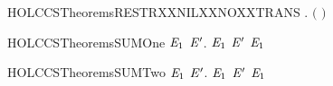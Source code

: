 \newcommand{\HOLCCSTheoremsRESTRXXLABELXXNOXXTRANS}{\UseVerbatim{HOLCCSTheoremsRESTRXXLABELXXNOXXTRANS}}
\begin{SaveVerbatim}{HOLCCSTheoremsRESTRXXNILXXNOXXTRANS}
\HOLTokenTurnstile{} \HOLSymConst{\HOLTokenForall{}}  . \HOLSymConst{\HOLTokenNeg{}}\ensuremath{(}   \HOLTokenTransBegin{}\HOLTokenTransEnd {}\ensuremath{)}
\end{SaveVerbatim}
\newcommand{\HOLCCSTheoremsRESTRXXNILXXNOXXTRANS}{\UseVerbatim{HOLCCSTheoremsRESTRXXNILXXNOXXTRANS}}
\begin{SaveVerbatim}{HOLCCSTheoremsSUMOne}
\HOLTokenTurnstile{} \HOLSymConst{\HOLTokenForall{}}  \ensuremath{\HOLBoundVar{E}\sb{\mathrm{1}}} \ensuremath{\HOLBoundVar{E}\sp{\prime{}}}.  \HOLTokenTransBegin{}\HOLTokenTransEnd \ensuremath{\HOLBoundVar{E}\sb{\mathrm{1}}} \HOLSymConst{\HOLTokenImp{}}  \HOLSymConst{\ensuremath{+}} \ensuremath{\HOLBoundVar{E}\sp{\prime{}}} \HOLTokenTransBegin{}\HOLTokenTransEnd \ensuremath{\HOLBoundVar{E}\sb{\mathrm{1}}}
\end{SaveVerbatim}
\newcommand{\HOLCCSTheoremsSUMOne}{\UseVerbatim{HOLCCSTheoremsSUMOne}}
\begin{SaveVerbatim}{HOLCCSTheoremsSUMTwo}
\HOLTokenTurnstile{} \HOLSymConst{\HOLTokenForall{}}  \ensuremath{\HOLBoundVar{E}\sb{\mathrm{1}}} \ensuremath{\HOLBoundVar{E}\sp{\prime{}}}.  \HOLTokenTransBegin{}\HOLTokenTransEnd \ensuremath{\HOLBoundVar{E}\sb{\mathrm{1}}} \HOLSymConst{\HOLTokenImp{}} \ensuremath{\HOLBoundVar{E}\sp{\prime{}}} \HOLSymConst{\ensuremath{+}}  \HOLTokenTransBegin{}\HOLTokenTransEnd \ensuremath{\HOLBoundVar{E}\sb{\mathrm{1}}}
\end{SaveVerbatim}
\newcommand{\HOLCCSTheoremsSUMTwo}{\UseVerbatim{HOLCCSTheoremsSUMTwo}}
